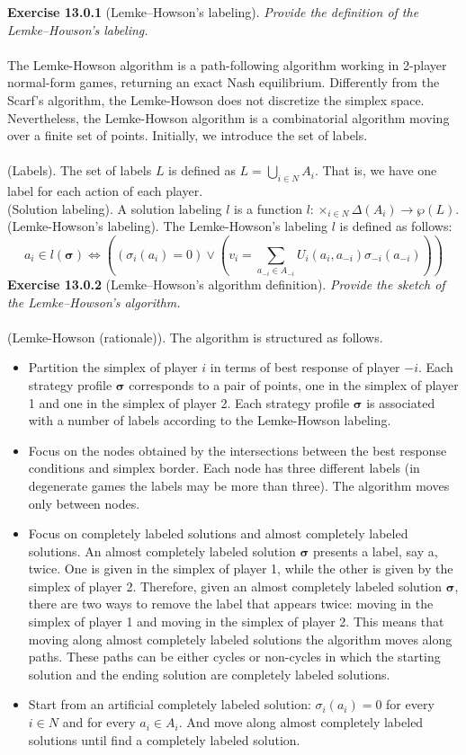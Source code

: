 \textbf{Exercise 13.0.1} (Lemke–Howson’s labeling). \textit{Provide the definition of the Lemke–Howson’s labeling.}\\\\
The Lemke-Howson algorithm is a path-following algorithm working in 2-player normal-form games, returning an exact Nash equilibrium. Differently from the Scarf’s algorithm, the Lemke-Howson does not discretize the simplex space. Nevertheless, the Lemke-Howson algorithm is a combinatorial algorithm moving over a finite set
of points. Initially, we introduce the set of labels.\\\\
(Labels). The set of labels $L$ is defined as $L = \bigcup_{i \in N}{A_i}$. That is, we have one label for each action of each player.\\
(Solution labeling). A solution labeling $l$ is a function $l: \times_{i \in N} \Delta (A_i) \rightarrow \wp (L)$.
(Lemke-Howson's labeling). The Lemke-Howson's labeling $l$ is defined as follows:
$$
a_{i} \in l(\bm{\sigma}) \Longleftrightarrow\left(\left(\sigma_{i}\left(a_{i}\right)=0\right) \vee\left(v_{i}=\sum_{a_{-i} \in A_{-i}} U_{i}\left(a_{i}, a_{-i}\right) \sigma_{-i}\left(a_{-i}\right)\right)\right)
$$
\textbf{Exercise 13.0.2} (Lemke–Howson’s algorithm definition). \textit{Provide the sketch of the Lemke–Howson’s algorithm.}\\\\
(Lemke-Howson (rationale)). The algorithm is structured as follows.
\begin{itemize}
\item Partition the simplex of player $i$ in terms of best response of player $-i$. Each strategy profile $\mathbf{\sigma}$ corresponds
to a pair of points, one in the simplex of player 1 and one in the simplex of player 2. Each strategy profile $\mathbf{\sigma}$ is associated with a number of labels according to the Lemke-Howson labeling.
\item Focus on the nodes obtained by the intersections between the best response conditions and simplex border. Each node has three different labels (in degenerate games the labels may be more than three). The algorithm moves only between nodes.
\item Focus on completely labeled solutions and almost completely labeled solutions. An almost completely labeled solution $\mathbf{\sigma}$ presents a label, say \textsf{a}, twice. One is given in the simplex of player 1, while the other is given by the simplex of player 2. Therefore, given an almost completely labeled solution $\mathbf{\sigma}$, there are two ways to remove the label that appears twice: moving in the simplex of player 1 and moving in the
simplex of player 2. This means that moving along almost completely labeled solutions the algorithm moves along paths. These paths can be either cycles or non-cycles in which the starting solution and
the ending solution are completely labeled solutions.
\item Start from an artificial completely labeled solution: $\sigma_i (a_i) = 0$ for every $i \in N$ and for every $a_i \in A_i$.
And move along almost completely labeled solutions until find a completely labeled solution.
\end{itemize}
